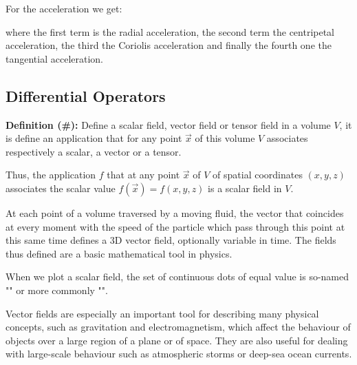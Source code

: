	For the acceleration we get:	
	
	where the first term is the radial acceleration, the second term the centripetal acceleration, the third the Coriolis acceleration and finally the fourth one the tangential acceleration.
	
	\pagebreak
	\subsection{Differential Operators}\label{differential operators}
	\textbf{Definition (\#\mydef):} Define a scalar field, vector field or tensor field in a volume $V$, it is define an application that for any point $\vec{x}$ of this volume $V$ associates respectively a scalar, a vector or a tensor.
	
	Thus, the application $f$ that at any point $\vec{x}$ of $V$ of spatial coordinates $(x, y, z)$ associates the scalar value $f(\vec{x})=f(x,y,z)$ is a scalar field in $V$.
	
	At each point of a volume traversed by a moving fluid, the vector that coincides at every moment with the speed of the particle which pass through this point at this same time defines a 3D vector field, optionally variable in time. The fields thus defined are a basic mathematical tool in physics.
	\begin{tcolorbox}[title=Remark,colframe=black,arc=10pt]
	When we plot a scalar field, the set of continuous dots of equal value is so-named "" or more commonly "".
	\end{tcolorbox}
	Vector fields are especially an important tool for describing many physical concepts, such as gravitation and electromagnetism, which affect the behaviour of objects over a large region of a plane or of space. They are also useful for dealing with large-scale behaviour such as atmospheric storms or deep-sea ocean currents.

